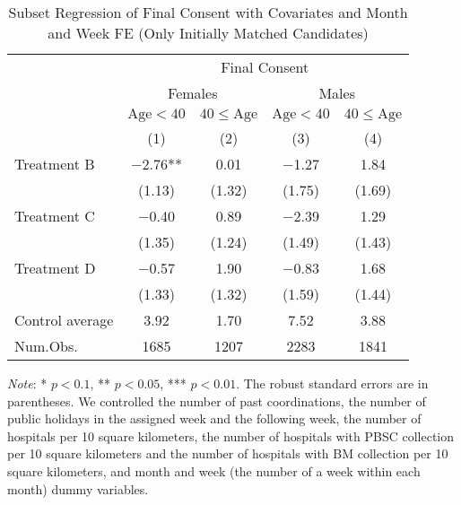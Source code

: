 \documentclass[12pt, a4paper]{article}
\begin{document}
\begin{table}[H]

\caption{\label{tab:lm-consent-subset2-init}Subset Regression of Final Consent with Covariates and Month and Week FE (Only Initially Matched Candidates)}
\centering
\fontsize{8}{10}\selectfont
\begin{threeparttable}
\begin{tabular}[t]{lcccc}
\toprule
\multicolumn{1}{c}{ } & \multicolumn{4}{c}{Final Consent} \\
\cmidrule(l{3pt}r{3pt}){2-5}
\multicolumn{1}{c}{ } & \multicolumn{2}{c}{Females} & \multicolumn{2}{c}{Males} \\
\cmidrule(l{3pt}r{3pt}){2-3} \cmidrule(l{3pt}r{3pt}){4-5}
\multicolumn{1}{c}{ } & \multicolumn{1}{c}{$\text{Age} < 40$} & \multicolumn{1}{c}{$40 \le \text{Age}$} & \multicolumn{1}{c}{$\text{Age} < 40$} & \multicolumn{1}{c}{$40 \le \text{Age}$} \\
\cmidrule(l{3pt}r{3pt}){2-2} \cmidrule(l{3pt}r{3pt}){3-3} \cmidrule(l{3pt}r{3pt}){4-4} \cmidrule(l{3pt}r{3pt}){5-5}
  & (1) & (2) & (3) & (4)\\
\midrule
Treatment B & \num{-2.76}** & \num{0.01} & \num{-1.27} & \num{1.84}\\
 & (\num{1.13}) & (\num{1.32}) & (\num{1.75}) & (\num{1.69})\\
Treatment C & \num{-0.40} & \num{0.89} & \num{-2.39} & \num{1.29}\\
 & (\num{1.35}) & (\num{1.24}) & (\num{1.49}) & (\num{1.43})\\
Treatment D & \num{-0.57} & \num{1.90} & \num{-0.83} & \num{1.68}\\
 & (\num{1.33}) & (\num{1.32}) & (\num{1.59}) & (\num{1.44})\\
\midrule
Control average & 3.92 & 1.70 & 7.52 & 3.88\\
Num.Obs. & \num{1685} & \num{1207} & \num{2283} & \num{1841}\\
\bottomrule
\end{tabular}
\begin{tablenotes}
\item \emph{Note}: * $p < 0.1$, ** $p < 0.05$, *** $p < 0.01$. The robust standard errors are in parentheses. We controlled the number of past coordinations, the number of public holidays in the assigned week and the following week, the number of hospitals per 10 square kilometers, the number of hospitals with PBSC collection per 10 square kilometers and the number of hospitals with BM collection per 10 square kilometers, and month and week (the number of a week within each month) dummy variables.
\end{tablenotes}
\end{threeparttable}
\end{table}

\clearpage


\end{document}
